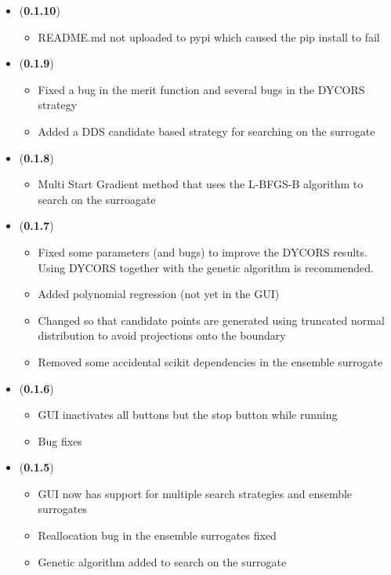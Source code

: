 \documentclass[]{article}
\begin{document}
\begin{itemize}
	\item (\textbf{0.1.10}) 
	\begin{itemize}
		\item README.md not uploaded to pypi which caused the pip install to fail
	\end{itemize}

	\item (\textbf{0.1.9}) 
	\begin{itemize}
		\item Fixed a bug in the merit function and several bugs in the DYCORS strategy
		\item Added a DDS candidate based strategy for searching on the surrogate
	\end{itemize}

	\item (\textbf{0.1.8}) 
	\begin{itemize}
		\item Multi Start Gradient method that uses the L-BFGS-B algorithm to search on the surroagate
	\end{itemize}

	\item (\textbf{0.1.7}) 
	\begin{itemize}
		\item Fixed some parameters (and bugs) to improve the DYCORS results. Using DYCORS together 
		with the genetic algorithm is recommended.
		\item Added polynomial regression (not yet in the GUI)
		\item Changed so that candidate points are generated using truncated normal distribution to avoid 
		projections onto the boundary
		\item Removed some accidental scikit dependencies in the ensemble surrogate
	\end{itemize}

	\item (\textbf{0.1.6}) 
	\begin{itemize}
		\item GUI inactivates all buttons but the stop button while running
		\item Bug fixes
	\end{itemize}

	\item (\textbf{0.1.5}) 
	\begin{itemize}
		\item GUI now has support for multiple search strategies and ensemble surrogates
		\item Reallocation bug in the ensemble surrogates fixed
		\item Genetic algorithm added to search on the surrogate
	\end{itemize}


\end{itemize}
\end{document}

